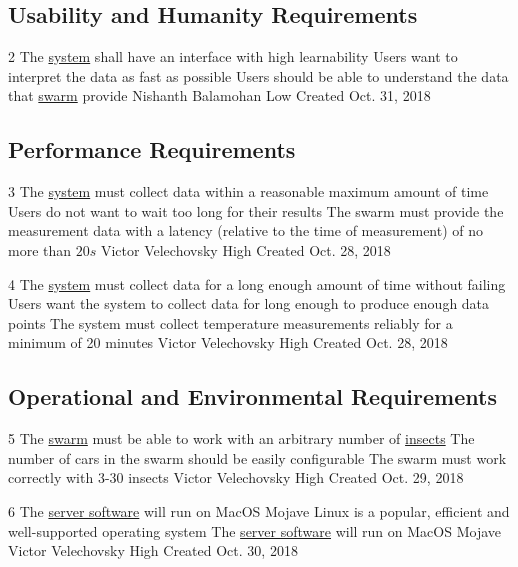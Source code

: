 \documentclass[11pt]{article}
\begin{document}
\subsection{Usability and Humanity Requirements}

\nonFunctionalRequirement
{2}
{The \hyperref[sec:definitions]{system} shall have an interface with high learnability}
{Users want to interpret the data as fast as possible}
{Users should be able to understand the data that \hyperref[sec:definitions]{swarm} provide}
{Nishanth Balamohan}
{Low}
{Created Oct. 31, 2018}

\subsection{Performance Requirements}

\nonFunctionalRequirement
{3}
{The \hyperref[sec:definitions]{system} must collect data within a reasonable
maximum amount of time}
{Users do not want to wait too long for their results}
{The swarm must provide the measurement data with a latency (relative to the
time of measurement) of no more than $20s$}
{Victor Velechovsky}
{High}
{Created Oct. 28, 2018}

\nonFunctionalRequirement
{4}
{The \hyperref[sec:definitions]{system} must collect data for a long enough
amount of time without failing}
{Users want the system to collect data for long enough to produce enough
data points}
{The system must collect temperature measurements reliably for a minimum of
20 minutes}
{Victor Velechovsky}
{High}
{Created Oct. 28, 2018}

\subsection{Operational and Environmental Requirements}

\nonFunctionalRequirement
{5}
{The \hyperref[sec:definitions]{swarm} must be able to work with an arbitrary
number of \hyperref[sec:definitions]{insects}}
{The number of cars in the swarm should be easily configurable}
{The swarm must work correctly with 3-30 insects}
{Victor Velechovsky}
{High}
{Created Oct. 29, 2018}

\nonFunctionalRequirement
{6}
{The \hyperref[sec:definitions]{server software} will run on MacOS Mojave}
{Linux is a popular, efficient and well-supported operating system}
{The \hyperref[sec:definitions]{server software} will run on MacOS Mojave}
{Victor Velechovsky}
{High}
{Created Oct. 30, 2018}
\end{document}
